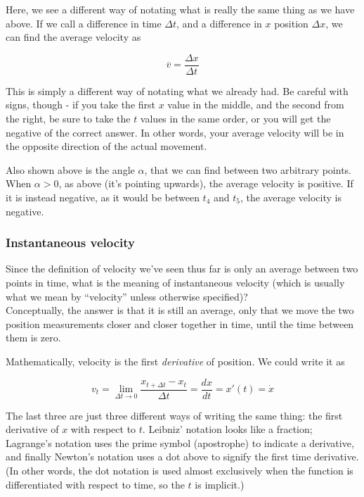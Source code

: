 \documentclass[8.01x]{subfiles}
\begin{document}
Here, we see a different way of notating what is really the same thing as we have above. If we call a difference in time $\Delta t$, and a difference in $x$ position $\Delta x$, we can find the average velocity as

\begin{equation}
 \overbar{v} = \frac{\Delta x}{\Delta t}
\end{equation} 

This is simply a different way of notating what we already had. Be careful with signs, though - if you take the first $x$ value in the middle, and the second from the right, be sure to take the $t$ values in the same order, or you will get the negative of the correct answer. In other words, your average velocity will be in the opposite direction of the actual movement.

Also shown above is the angle $\alpha$, that we can find between two arbitrary points. When $\alpha > 0$, as above (it's pointing upwards), the average velocity is positive. If it is instead negative, as it would be between $t_4$ and $t_5$, the average velocity is negative.

\subsubsection{Instantaneous velocity}

Since the definition of velocity we've seen thus far is only an average between two points in time, what is the meaning of instantaneous velocity (which is usually what we mean by ``velocity'' unless otherwise specified)?\\
Conceptually, the answer is that it is still an average, only that we move the two position measurements closer and closer together in time, until the time between them is zero.

Mathematically, velocity is the first \emph{derivative} of position.
We could write it as

\begingroup
\large
\begin{equation}
 v_t = \lim_{\Delta t \to 0} \frac{x_{t + \Delta t} - x_t}{\Delta t} = \frac{dx}{dt} = x'(t) = \dot{x}
\end{equation}
\endgroup

The last three are just three different ways of writing the same thing: the first derivative of $x$ with respect to $t$. Leibniz' notation looks like a fraction; Lagrange's notation uses the prime symbol (apostrophe) to indicate a derivative, and finally Newton's notation uses a dot above to signify the first time derivative. (In other words, the dot notation is used almost exclusively when the function is differentiated with respect to time, so the $t$ is implicit.)
\end{document}
